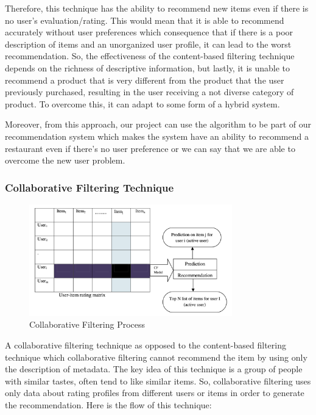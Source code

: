 \documentclass[12pt,oneside,openright,a4paper]{cpe-english-project}
\begin{document}
Therefore, this technique has the ability to recommend new items even if there is no user’s evaluation/rating. This would mean that it is able to recommend accurately without user preferences which consequence that if there is a poor description of items and an unorganized user profile, it can lead to the worst recommendation. So, the effectiveness of the content-based filtering technique depends on the richness of descriptive information, but lastly, it is unable to recommend a product that is very different from the product that the user previously purchased, resulting in the user receiving a not diverse category of product. To overcome this, it can adapt to some form of a hybrid system.

Moreover, from this approach, our project can use the algorithm to be part of our recommendation system which makes the system have an ability to recommend a restaurant even if there’s no user preference or we can say that we are able to overcome the new user problem.


\subsubsection{Collaborative Filtering Technique}

\begin{figure}[H]\centering
\includegraphics[width=250pt]{./images/2cfprocess.png}
\caption{Collaborative Filtering Process}
\label{fig:2cfprocess}
\end{figure}

A collaborative filtering technique as opposed to the content-based filtering technique which collaborative filtering cannot recommend the item by using only the description of metadata. The key idea of this technique is a group of people with similar tastes, often tend to like similar items. So, collaborative filtering uses only data about rating profiles from different users or items in order to generate the recommendation. Here is the flow of this technique:
\end{document}
